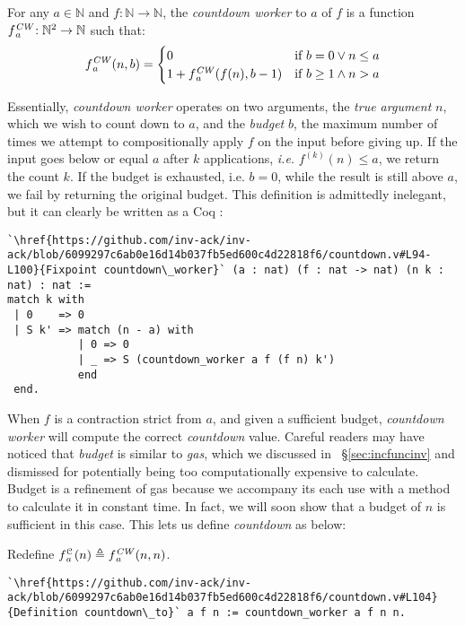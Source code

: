 \begin{defn} \label{defn: countdown-worker}
For any $a\in \mathbb{N}$ and $f: \mathbb{N}\to \mathbb{N}$, the \emph{countdown worker} to $a$ of $f$ is a function $\cdw{f}{a}\ : \mathbb{N}^2\to \mathbb{N}$ such that:
\begin{equation*}
\cdw{f}{a}(n, b) = \begin{cases}
0 & \text{if } b = 0 \vee n\le a \\ 1 +\cdw{f}{a}(f(n), b-1) & \text{if } b \ge 1 \wedge n > a
\end{cases}
\end{equation*}
\end{defn}
Essentially, \emph{countdown worker} operates on two arguments, the \emph{true argument} $n$, which we wish to count down to $a$, and the \emph{budget} $b$, the maximum number of times we attempt 
to compositionally apply $f$ on the input before giving up. If the input goes below or equal $a$ after $k$ applications, \emph{i.e.} $f^{(k)}(n) \le a$, we return the count $k$. If the budget is exhausted, i.e. $b = 0$, while the result is still above $a$, we fail by returning the original budget. This definition is admittedly inelegant, but it can clearly be written as a Coq :
\begin{lstlisting}
`\href{https://github.com/inv-ack/inv-ack/blob/6099297c6ab0e16d14b037fb5ed600c4d22818f6/countdown.v#L94-L100}{Fixpoint countdown\_worker}` (a : nat) (f : nat -> nat) (n k : nat) : nat :=
match k with
 | 0    => 0
 | S k' => match (n - a) with
           | 0 => 0
           | _ => S (countdown_worker a f (f n) k') 
           end
 end.
\end{lstlisting}
When $f$ is a contraction strict from $a$, and given a sufficient budget, \emph{countdown worker} 
will compute the correct \emph{countdown} value.  
Careful readers may have noticed that \emph{budget} is similar to 
\emph{gas}, which we discussed in ~\S\ref{sec:incfuncinv} 
and dismissed for potentially 
being too computationally expensive to calculate. 
Budget is a refinement of gas because 
we accompany its each use with a method to calculate it in constant time.
In fact, we will soon show that a budget of $n$ is sufficient in this case. 
This lets us define \emph{countdown} as below:
\begin{defn} \label{defn: countdown}
Redefine $\cdt{f}{a}(n) \triangleq \cdw{f}{a}(n, n)$.
\begin{lstlisting}
`\href{https://github.com/inv-ack/inv-ack/blob/6099297c6ab0e16d14b037fb5ed600c4d22818f6/countdown.v#L104}{Definition countdown\_to}` a f n := countdown_worker a f n n.
\end{lstlisting}
\end{defn}

